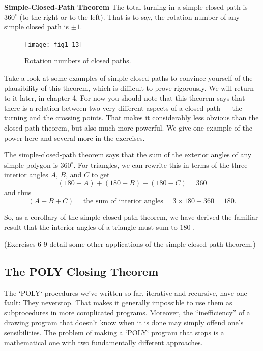 \documentclass{book}
\begin{document}
\noindent \textbf{Simple-Closed-Path Theorem} The total turning in a simple closed path
is $360^{\circ}$ (to the right or to the left). That is to say, the rotation number
of any simple closed path is $\pm 1$.

\vspace{0.5cm}

\begin{figure}
\begin{center}
\texttt{[image: fig1-13]}
\caption{Rotation numbers of closed paths.}
\end{center}
\end{figure}

Take a look at some examples of simple closed paths to convince
yourself of the plausibility of this theorem, which is difficult to prove
rigorously. We will return to it later, in chapter 4. For now you should
note that this theorem says that there is a relation between two very
different aspects of a closed path --- the turning and the crossing points.
That makes it considerably less obvious than the closed-path theorem,
but also much more powerful. We give one example of the power here
and several more in the exercises.

The simple-closed-path theorem says that the sum of the exterior
angles of any simple polygon is $360^{\circ}$. For triangles, we can rewrite this
in terms of the three interior angles $A$, $B$, and $C$ to get
$$(180 - A) + (180 - B) + (180 - C) = 360$$
\noindent and thus
$$(A + B + C) = \text{the sum of interior angles} = 3 \times 180 - 360 = 180.$$

So, as a corollary of the simple-closed-path theorem, we have derived the
familiar result that the interior angles of a triangle must sum to $180^{\circ}$.

(Exercises 6-9 detail some other applications of the simple-closed-path
theorem.)

\subsection{The POLY Closing Theorem}

The \textsc{`POLY`} procedures we've written so far, iterative and recursive, have
one fault: They neverstop. That makes it generally impossible to
use them as subprocedures in more complicated programs. Moreover,
the ``inefficiency'' of a drawing program that doesn't know when it is
done may simply offend one's sensibilities. The problem of making a
\textsc{`POLY`} program that stops is a mathematical one with two fundamentally
different approaches.
\end{document}

